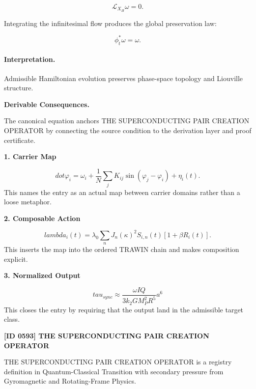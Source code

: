 \begin{equation}
\mathcal{L}_{X_H}\omega=0.
\end{equation}

Integrating the infinitesimal flow produces the global preservation law:

\begin{equation}
\boxed{
\phi_t^{*}\omega=\omega.
}
\end{equation}

\paragraph{Interpretation.}
Admissible Hamiltonian evolution preserves phase-space topology and Liouville structure.

\par\vspace{0.35em}
\noindent\textbf{Derivable Consequences.}\quad
\begingroup
\footnotesize
\raggedright
The canonical equation anchors THE SUPERCONDUCTING PAIR CREATION OPERATOR by connecting the source condition to the derivation layer and proof certificate.
\par\endgroup

\noindent\textbf{1. Carrier Map}\par
\[
dot\varphi_i = \omega_i + \frac{1}{N}\sum_j K_{ij}\sin(\varphi_j-\varphi_i) + \eta_i(t).
\]
\noindent This names the entry as an actual map between carrier domains rather than a loose metaphor.\par
\noindent\textbf{2. Composable Action}\par
\[
lambda_i(t) = \lambda_0 \sum_n J_n(\kappa)^2 S_{i,n}(t) [1+\beta R_i(t)].
\]
\noindent This inserts the map into the ordered TRAWIN chain and makes composition explicit.\par
\noindent\textbf{3. Normalized Output}\par
\[
tau_{sync} \approx \frac{\omega I Q}{3 k_2 G M_P^2 R^5} a^6
\]
\noindent This closes the entry by requiring that the output land in the admissible target class.\par

\clearpage
\noindent\textbf{[ID 0593] THE SUPERCONDUCTING PAIR CREATION OPERATOR}\par
\vspace{0.35em}
\begingroup\small
{}
THE SUPERCONDUCTING PAIR CREATION OPERATOR is a registry definition in Quantum-Classical Transition with secondary pressure from Gyromagnetic and Rotating-Frame Physics.

